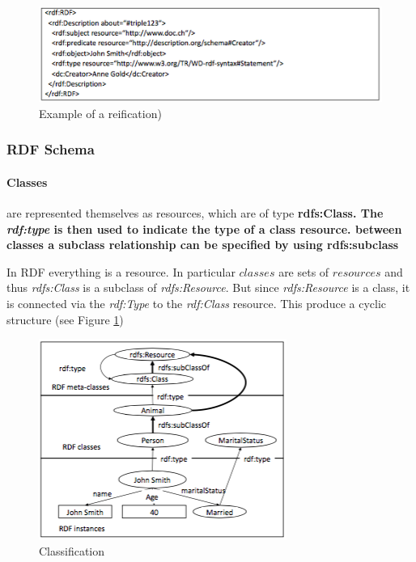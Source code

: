 \begin{figure}[H]
\begin{center}
\includegraphics[width=1\linewidth]{figures/reification.png}
\end{center}
\caption{Example of a reification)}
\end{figure}

\subsubsection{RDF Schema}

\paragraph{Classes} are represented themselves as resources, which are of type \bf{rdfs:Class}. The \textit{rdf:type} is then used to indicate the type of a class resource. between classes a subclass relationship can be specified by using \bf{rdfs:subclass}

In RDF everything is a resource. In particular $classes$ are sets of $resources$ and thus \textit{rdfs:Class} is a subclass of \textit{rdfs:Resource}. But since \textit{rdfs:Resource} is a class, it is connected via the \textit{rdf:Type} to the \textit{rdf:Class} resource. This produce a cyclic structure (see Figure \ref{fig:class})

\begin{figure}[H]
\begin{center}
\includegraphics[width=1\linewidth]{figures/class.png}
\end{center}
\caption{Classification}
\label{fig:class}
\end{figure}

